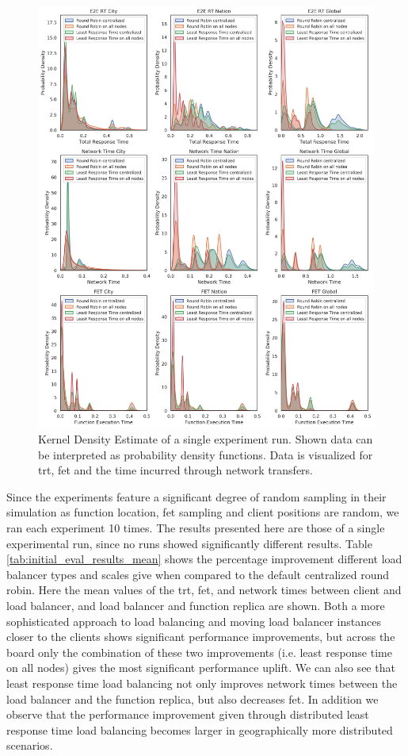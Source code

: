 \begin{figure}
    \centering
    \includegraphics[width=\linewidth]{graphics/graphs/initial_eval_pdfs_3x3_hires.png}
    \caption{Kernel Density Estimate of a single experiment run. Shown data can be interpreted as probability density functions. Data is visualized for \gls{trt}, \gls{fet} and the time incurred through network transfers.}
    \label{fig:initial_eval_pdfs}
\end{figure}

Since the experiments feature a significant degree of random sampling in their simulation as function location, \gls{fet} sampling and client positions are random, we ran each experiment 10 times.
The results presented here are those of a single experimental run, since no runs showed significantly different results.
Table \ref{tab:initial_eval_results_mean} shows the percentage improvement different load balancer types and scales give when compared to the default centralized round robin.
Here the mean values of the \gls{trt}, \gls{fet}, and network times between client and load balancer, and load balancer and function replica are shown.
Both a more sophisticated approach to load balancing and moving load balancer instances closer to the clients shows significant performance improvements, but across the board only the combination of these two improvements (i.e. least response time on all nodes) gives the most significant performance uplift.
We can also see that least response time load balancing not only improves network times between the load balancer and the function replica, but also decreases \gls{fet}.
In addition we observe that the performance improvement given through distributed least response time load balancing becomes larger in geographically more distributed scenarios.

